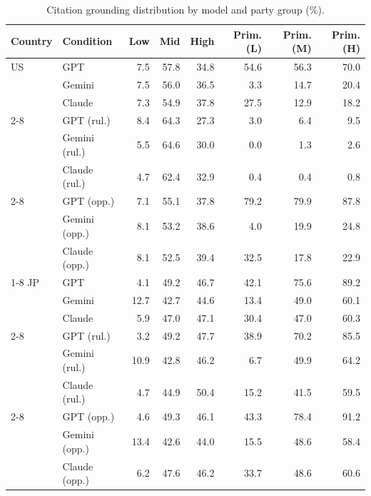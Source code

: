 \begin{table}[t]
\centering
\footnotesize
\setlength{\tabcolsep}{3pt}
\caption{Citation grounding distribution by model and party group (\%).}
\label{tab:citation-grounding-distribution-values}
\begin{tabular}{llrrrrrr}
\toprule
\textbf{Country} & \textbf{Condition} & \textbf{Low} & \textbf{Mid} & \textbf{High} & \textbf{Prim.(L)} & \textbf{Prim.(M)} & \textbf{Prim.(H)} \\
\midrule
US & GPT & 7.5 & 57.8 & 34.8 & 54.6 & 56.3 & 70.0 \\
 & Gemini & 7.5 & 56.0 & 36.5 & 3.3 & 14.7 & 20.4 \\
 & Claude & 7.3 & 54.9 & 37.8 & 27.5 & 12.9 & 18.2 \\
\cmidrule(lr){2-8}
 & GPT (rul.) & 8.4 & 64.3 & 27.3 & 3.0 & 6.4 & 9.5 \\
 & Gemini (rul.) & 5.5 & 64.6 & 30.0 & 0.0 & 1.3 & 2.6 \\
 & Claude (rul.) & 4.7 & 62.4 & 32.9 & 0.4 & 0.4 & 0.8 \\
\cmidrule(lr){2-8}
 & GPT (opp.) & 7.1 & 55.1 & 37.8 & 79.2 & 79.9 & 87.8 \\
 & Gemini (opp.) & 8.1 & 53.2 & 38.6 & 4.0 & 19.9 & 24.8 \\
 & Claude (opp.) & 8.1 & 52.5 & 39.4 & 32.5 & 17.8 & 22.9 \\
\cmidrule(lr){1-8}
JP & GPT & 4.1 & 49.2 & 46.7 & 42.1 & 75.6 & 89.2 \\
 & Gemini & 12.7 & 42.7 & 44.6 & 13.4 & 49.0 & 60.1 \\
 & Claude & 5.9 & 47.0 & 47.1 & 30.4 & 47.0 & 60.3 \\
\cmidrule(lr){2-8}
 & GPT (rul.) & 3.2 & 49.2 & 47.7 & 38.9 & 70.2 & 85.5 \\
 & Gemini (rul.) & 10.9 & 42.8 & 46.2 & 6.7 & 49.9 & 64.2 \\
 & Claude (rul.) & 4.7 & 44.9 & 50.4 & 15.2 & 41.5 & 59.5 \\
\cmidrule(lr){2-8}
 & GPT (opp.) & 4.6 & 49.3 & 46.1 & 43.3 & 78.4 & 91.2 \\
 & Gemini (opp.) & 13.4 & 42.6 & 44.0 & 15.5 & 48.6 & 58.4 \\
 & Claude (opp.) & 6.2 & 47.6 & 46.2 & 33.7 & 48.6 & 60.6 \\
\bottomrule
\end{tabular}
\end{table}

